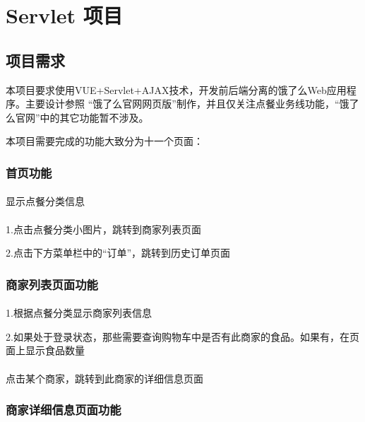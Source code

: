 
\chapter{Servlet 项目}

\section{项目需求}

本项目要求使用VUE+Servlet+AJAX技术，开发前后端分离的饿了么Web应用程序。主要设计参照 “饿了么官网网页版”制作，并且仅关注点餐业务线功能，“饿了么官网”中的其它功能暂不涉及。

本项目需要完成的功能大致分为十一个页面：~\\

\subsection{首页功能}
\subsubsection*{}
显示点餐分类信息
\subsubsection*{}
1.点击点餐分类小图片，跳转到商家列表页面

2.点击下方菜单栏中的“订单”，跳转到历史订单页面

\subsection{商家列表页面功能}
\subsubsection*{}
1.根据点餐分类显示商家列表信息

2.如果处于登录状态，那些需要查询购物车中是否有此商家的食品。如果有，在页面上显示食品数量
\subsubsection*{}
点击某个商家，跳转到此商家的详细信息页面

\subsection{商家详细信息页面功能}
